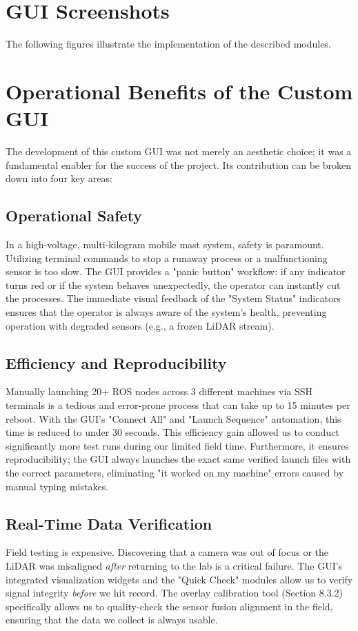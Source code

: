 \documentclass[12pt,a4paper]{report}
\begin{document}
\section{GUI Screenshots}
\label{sec:gui-screenshots}
The following figures illustrate the implementation of the described modules.

\section{Operational Benefits of the Custom GUI}
The development of this custom GUI was not merely an aesthetic choice; it was a fundamental enabler for the success of the project. Its contribution can be broken down into four key areas:

\subsection{Operational Safety}
In a high-voltage, multi-kilogram mobile mast system, safety is paramount. Utilizing terminal commands to stop a runaway process or a malfunctioning sensor is too slow. The GUI provides a "panic button" workflow: if any indicator turns red or if the system behaves unexpectedly, the operator can instantly cut the processes. The immediate visual feedback of the "System Status" indicators ensures that the operator is always aware of the system's health, preventing operation with degraded sensors (e.g., a frozen LiDAR stream).

\subsection{Efficiency and Reproducibility}
Manually launching 20+ ROS nodes across 3 different machines via SSH terminals is a tedious and error-prone process that can take up to 15 minutes per reboot. With the GUI's "Connect All" and "Launch Sequence" automation, this time is reduced to under 30 seconds. This efficiency gain allowed us to conduct significantly more test runs during our limited field time. Furthermore, it ensures reproducibility; the GUI always launches the exact same verified launch files with the correct parameters, eliminating "it worked on my machine" errors caused by manual typing mistakes.

\subsection{Real-Time Data Verification}
Field testing is expensive. Discovering that a camera was out of focus or the LiDAR was misaligned \textit{after} returning to the lab is a critical failure. The GUI's integrated visualization widgets and the "Quick Check" modules allow us to verify signal integrity \textit{before} we hit record. The overlay calibration tool (Section 8.3.2) specifically allows us to quality-check the sensor fusion alignment in the field, ensuring that the data we collect is always usable.
\end{document}
